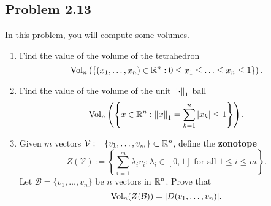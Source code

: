 \documentclass[12pt]{article}
\begin{document}
\subsection{Problem 2.13}
\begin{problem} \label{problem-2.13}
	In this problem, you will compute some volumes. 
    \begin{enumerate}[label = (\alph*)]
        \item Find the value of the volume of the tetrahedron
        \[
            \operatorname{Vol}_n \left ( \left \{ (x_1, \ldots, x_n) \in \mathbb{R}^n : 0 \leq x_1 \leq \ldots \leq x_n \leq 1 \right \} \right ).    
        \]
        \item Find the value of the volume of the unit $\left\lVert\cdot\right\rVert_1$ ball
        \[
            \operatorname{Vol}_n \left ( \left \{ x \in \mathbb{R}^n : \left\lVert x\right\rVert_1 = \sum_{k = 1}^n |x_k| \leq 1 \right \} \right ).
        \]
        
        \item Given $m$ vectors $\mathcal{V} := \{v_1, \ldots, v_m \} \subset \mathbb{R}^n$, define the \textbf{zonotope}
        \[
            Z(\mathcal{V}) := \left \{ \sum_{i = 1}^m \lambda_i v_i : \lambda_i \in [0, 1] \text{ for all } 1 \leq i \leq m \right \}.
        \]
        Let $\mathcal{B} = \{v_1, \ldots, v_n\}$ be $n$ vectors in $\mathbb{R}^n$. Prove that 
        \[
            \operatorname{Vol}_n(Z(\mathcal{B})) = | D(v_1, \ldots, v_n) |.
        \]
    \end{enumerate}
\end{problem}
\end{document}
